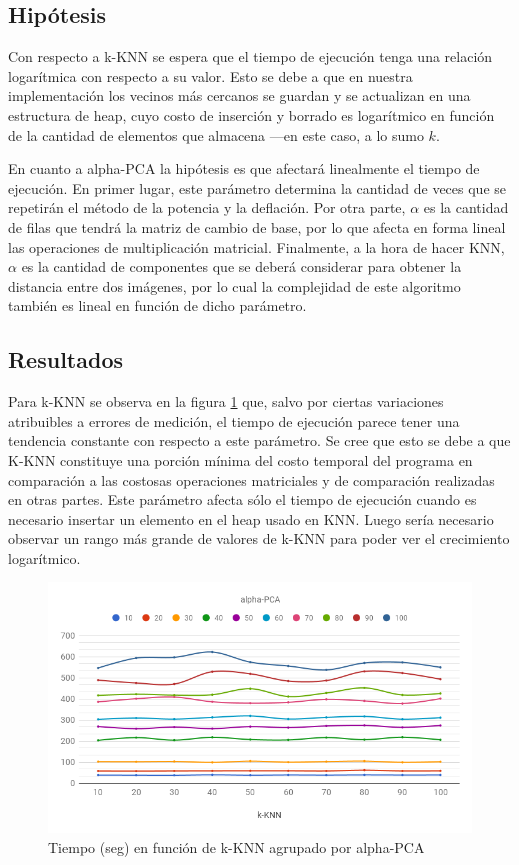 \subsection{Hipótesis}

Con respecto a k-KNN se espera que el tiempo de ejecución tenga una relación logarítmica con respecto a su valor. Esto se debe a que en nuestra implementación los vecinos más cercanos se guardan y se actualizan en una estructura de heap, cuyo costo de inserción y borrado es logarítmico en función de la cantidad de elementos que almacena ---en este caso, a lo sumo $k$.

En cuanto a alpha-PCA la hipótesis es que afectará linealmente el tiempo de ejecución. En primer lugar, este parámetro determina la cantidad de veces que se repetirán el método de la potencia y la deflación. Por otra parte, $\alpha$ es la cantidad de filas que tendrá la matriz de cambio de base, por lo que afecta en forma lineal las operaciones de multiplicación matricial. Finalmente, a la hora de hacer KNN, $\alpha$ es la cantidad de componentes que se deberá considerar para obtener la distancia entre dos imágenes, por lo cual la complejidad de este algoritmo también es lineal en función de dicho parámetro.

\subsection{Resultados}

Para k-KNN se observa en la figura \ref{fig:tiempo_knn} que, salvo por ciertas variaciones atribuibles a errores de medición, el tiempo de ejecución parece tener una tendencia constante con respecto a este parámetro. Se cree que esto se debe a que K-KNN constituye una porción mínima del costo temporal del programa en comparación a las costosas operaciones matriciales y de comparación realizadas en otras partes. Este parámetro afecta sólo el tiempo de ejecución cuando es necesario insertar un elemento en el heap usado en KNN. Luego sería necesario observar un rango más grande de valores de k-KNN para poder ver el crecimiento logarítmico.

\begin{figure}[H]
    \centering
    \includegraphics[width=\textwidth]{graficos/tiempo_knn.png}
    \caption{Tiempo (seg) en función de k-KNN agrupado por alpha-PCA}
    \label{fig:tiempo_knn}
\end{figure}

